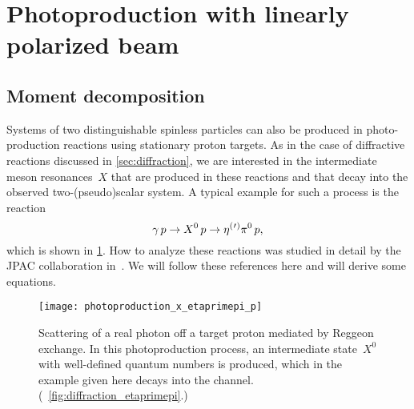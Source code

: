 \section{Photoproduction with linearly polarized beam}%
\label{sec:photoprod}

\subsection{Moment decomposition}%
\label{sec:photoprod:moment}

Systems of two distinguishable spinless particles can also be produced
in photo-production reactions using stationary proton targets.  As in
the case of diffractive reactions discussed in \cref{sec:diffraction},
we are interested in the intermediate meson resonances~$X$ that are
produced in these reactions and that decay into the observed
two-(pseudo)scalar system.  A typical example for such a process is
the reaction
\begin{equation}
  \label{eq:etaOrPr_pi_photoprod}
  \gamma\, p \to X^0\, p \to \etaOrPr\pi^0\, p,
\end{equation}
which is shown in \cref{fig:photoprod_etaprimepi}.  How to analyze
these reactions was studied in detail by the JPAC collaboration
in~.  We will follow these
references here and will derive some equations.

\begin{figure}[bp]
  \centering%
  \texttt{[image: photoproduction\_x\_etaprimepi\_p]}%
  \caption{Scattering of a real photon off a target proton mediated by
  Reggeon exchange.  In this photoproduction process, an intermediate
  state~$X^0$ with well-defined quantum numbers is produced, which in
  the example given here decays into the \etaOrPrPim channel.
  (\Confer~\cref{fig:diffraction_etaprimepi}.)}%
  \label{fig:photoprod_etaprimepi}%
\end{figure}


